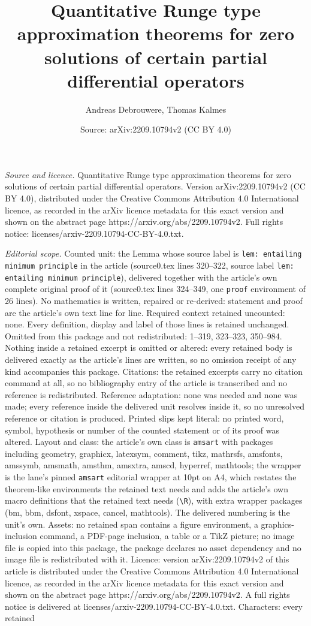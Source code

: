 \documentclass[10pt,a4paper]{amsart}
\title[Quantitative Runge type approximation theorems for zero solu]{Quantitative Runge type approximation theorems for zero solutions of certain partial differential operators}
\author{Andreas Debrouwere, Thomas Kalmes}
\date{Source: arXiv:2209.10794v2 (CC BY 4.0)}
\begin{document}
\maketitle

\noindent\emph{Source and licence.} Quantitative Runge type approximation theorems for zero solutions of certain partial differential operators. Version arXiv:2209.10794v2 (CC BY 4.0), distributed under the Creative Commons Attribution 4.0 International licence, as recorded in the arXiv licence metadata for this exact version and shown on the abstract page https://arxiv.org/abs/2209.10794v2. Full rights notice: licenses/arxiv-2209.10794-CC-BY-4.0.txt.\par\smallskip

\noindent\textit{Editorial scope.} Counted unit: the Lemma whose source label is \texttt{lem: entailing minimum principle} in the article (source0.tex lines 320--322, source label \texttt{lem: entailing minimum principle}), delivered together with the article's own complete original proof of it (source0.tex lines 324--349, one \texttt{proof} environment of 26 lines). No mathematics is written, repaired or re-derived: statement and proof are the article's own text line for line. Required context retained uncounted: none. Every definition, display and label of those lines is retained unchanged. Omitted from this package and not redistributed: 1--319, 323--323, 350--984. Nothing inside a retained excerpt is omitted or altered: every retained body is delivered exactly as the article's lines are written, so no omission receipt of any kind accompanies this package. Citations: the retained excerpts carry no citation command at all, so no bibliography entry of the article is transcribed and no reference is redistributed. Reference adaptation: none was needed and none was made; every reference inside the delivered unit resolves inside it, so no unresolved reference or citation is produced. Printed slips kept literal: no printed word, symbol, hypothesis or number of the counted statement or of its proof was altered. Layout and class: the article's own class is \texttt{amsart} with packages including geometry, graphicx, latexsym, comment, tikz, mathrsfs, amsfonts, amssymb, amsmath, amsthm, amsxtra, amscd, hyperref, mathtools; the wrapper is the lane's pinned \texttt{amsart} editorial wrapper at 10pt on A4, which restates the theorem-like environments the retained text needs and adds the article's own macro definitions that the retained text needs (\texttt{\textbackslash R}), with extra wrapper packages (bm, bbm, dsfont, xspace, cancel, mathtools). The delivered numbering is the unit's own. Assets: no retained span contains a figure environment, a graphics-inclusion command, a PDF-page inclusion, a table or a TikZ picture; no image file is copied into this package, the package declares no asset dependency and no image file is redistributed with it. Licence: version arXiv:2209.10794v2 of this article is distributed under the Creative Commons Attribution 4.0 International licence, as recorded in the arXiv licence metadata for this exact version and shown on the abstract page https://arxiv.org/abs/2209.10794v2. A full rights notice is delivered at licenses/arxiv-2209.10794-CC-BY-4.0.txt. Characters: every retained 
\end{document}
